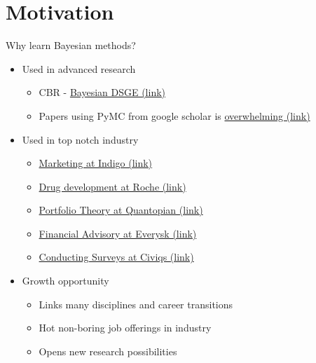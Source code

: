 \documentclass{beamer}
\begin{document}
\section{Motivation}
\begin{frame}{Why learn Bayesian methods?}
    \begin{itemize}
        \item Used in advanced research
        \begin{itemize}
            \item CBR - \href{https://www.cbr.ru/Content/Document/File/119374/bDSGE.pdf}{Bayesian DSGE (link)}
            \item Papers using PyMC from google scholar is \href{https://scholar.google.com/scholar?hl=ru&as_sdt=2005&sciodt=0,5&cites=6936955228135731011&scipsc=&q=&scisbd=1}{overwhelming (link)}
        \end{itemize}

        \item Used in top notch industry
        \begin{itemize}
            \item \href{https://engineering.hellofresh.com/bayesian-media-mix-modeling-using-pymc3-for-fun-and-profit-2bd4667504e6}{Marketing at Indigo (link)}
            \item \href{https://pubmed.ncbi.nlm.nih.gov/27442271/}{Drug development at Roche (link)}
            \item \href{https://github.com/quantopian/bayesalpha}{Portfolio Theory at Quantopian (link)}
            \item \href{https://support.everysk.com/hc/en-us/articles/1500001040721-Private-Investments}{Financial Advisory at Everysk (link)}
            \item \href{https://discourse.pymc.io/t/job-opening-director-of-data-science-at-civiqs/1895}{Conducting Surveys at Civiqs (link)}
        \end{itemize}
        \item Growth opportunity
        \begin{itemize}
            \item Links many disciplines and career transitions
            \item Hot non-boring job offerings in industry
            \item Opens new research possibilities
        \end{itemize}
    \end{itemize}
\end{frame}
\end{document}
